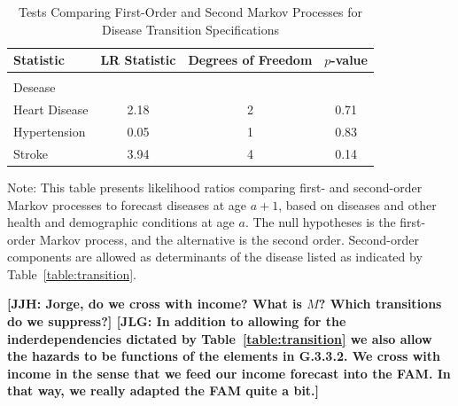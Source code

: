 \begin{table}[H]
\begin{threeparttable}
\caption{Tests Comparing First-Order and Second Markov Processes for Disease Transition Specifications} \label{table:lrtests}
\centering
\footnotesize
\begin{tabular}{lccc}
\toprule
Statistic & LR Statistic & Degrees of Freedom & $p$-value \\
\midrule \\
Desease & \\
Heart Disease & 2.18 & 2 & 0.71 \\
Hypertension   & 0.05 & 1 & 0.83 \\
Stroke              & 3.94 & 4 & 0.14 \\
\bottomrule
\end{tabular}
\begin{tablenotes}
\footnotesize
\item Note: This table presents likelihood ratios comparing first- and second-order Markov processes to forecast diseases at age $a+1$, based on diseases and other health and demographic conditions at age $a$. The null hypotheses is the first-order Markov process, and the alternative is the second order. Second-order components are allowed as determinants of the disease listed as indicated by Table~\ref{table:transition}.
\end{tablenotes}
\end{threeparttable}
\end{table}
\textbf{[JJH: Jorge, do we cross with income? What is $M$? Which transitions do we suppress?] [JLG: In addition to allowing for the inderdependencies dictated by Table~\ref{table:transition} we also allow the hazards to be functions of the elements in G.3.3.2. We cross with income in the sense that we feed our income forecast into the FAM. In that way, we really adapted the FAM quite a bit.]}

